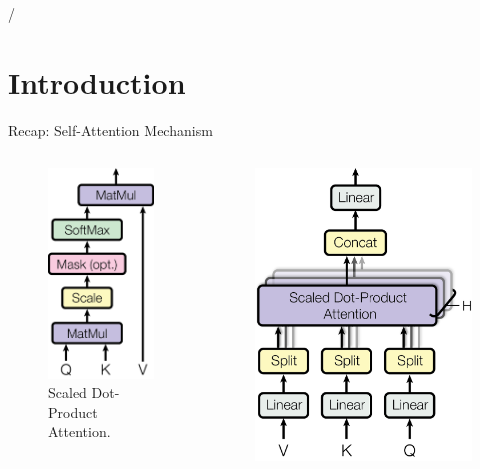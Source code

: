 /\section{Introduction}

\begin{frame}{Recap: Self-Attention Mechanism}
    \begin{columns}
        \begin{column}{0.5\textwidth}
            \begin{figure}
                \centering
                \includegraphics[height=0.75\textwidth]{pic/ModalNet-19}
                \caption{
                Scaled Dot-Product Attention.
                }
                \label{fig:doprod}
            \end{figure}
        \end{column}
        \begin{column}{0.5\textwidth}
            \begin{figure}
                \centering
                \includegraphics[height=0.75\textwidth]{pic/ModalNet-32}

\end{figure}
\end{column}
\end{columns}
\end{frame}
